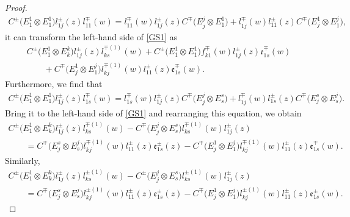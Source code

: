 \documentclass[10pt,a4paper]{amsart}
\numberwithin{equation}{section}
\begin{document}
\begin{proof}
\begin{gather*}
 C^{\pm}\bigl(E^1_1\otimes E^1_1\bigr)l_{1j}^{\pm}(z)l_{11}^{\mp}(w)= l_{11}^{\mp}(w)l_{1j}^{\pm}(z)C^{\mp}\bigl(E^j_j\otimes E^1_1\bigr)+l_{1j}^{\mp}(w)l_{11}^{\pm}(z)C^{\mp}\bigl(E^1_j\otimes E^j_1\bigr),
\end{gather*}
it can transform the left-hand side of \eqref{GS1} as
\begin{gather*}
 C^{\pm}\bigl(E^1_1\otimes E^k_k\bigr)l_{1j}^{\pm}(z)l_{ks}^{\mp(1)}(w)+ C^{\pm}\bigl(E^1_1\otimes E^1_1\bigr)f_{k1}^{\mp}(w)l_{1j}^{\pm}(z)\mathfrak{e}_{1s}^{\mp}(w)\\
 \qquad{}+
 C^{\mp}\bigl(E^1_j\otimes E^j_1\bigr)l_{kj}^{\mp(1)}(w)l_{11}^{\pm}(z)\mathfrak{e}_{1s}^{\mp}(w).
\end{gather*}
Furthermore, we find that
\begin{gather*}
 C^{\pm}\bigl(E^1_1\otimes E^1_1\bigr)l_{1j}^{\pm}(z)l_{1s}^{\mp}(w)= l_{1s}^{\mp}(w)l_{1j}^{\pm}(z)C^{\mp}\bigl(E^j_j\otimes E^s_s\bigr)+l_{1j}^{\mp}(w)l_{1s}^{\pm}(z)C^{\mp}\bigl(E^s_j\otimes E^j_s\bigr).
\end{gather*}
Bring it to the left-hand side of \eqref{GS1} and rearranging this equation, we obtain
\begin{gather}
 C^{\pm}\bigl(E^1_1\otimes E^k_k\bigr)l_{1j}^{\pm}(z)l_{ks}^{\mp(1)}(w)- C^{\mp}\bigl(E^j_j\otimes E^s_s\bigr)l_{ks}^{\mp(1)}(w)l_{1j}^{\pm}(z) \nonumber\\ \qquad=C^{\mp}\bigl(E^s_j\otimes E^j_s\bigr)l_{kj}^{\mp(1)}(w)l_{11}^{\pm}(z)\mathfrak{e}_{1s}^{\pm}(z)-C^{\mp}\bigl(E^1_j\otimes E^j_1\bigr)l_{kj}^{\mp(1)}(w)l_{11}^{\pm}(z)\mathfrak{e}_{1s}^{\mp}(w).\label{GS2}
\end{gather}
Similarly,
\begin{gather*}%
 C^{\pm}\bigl(E^1_1\otimes E^k_k\bigr)l_{1j}^{\pm}(z)l_{ks}^{\pm(1)}(w)- C^{\pm}\bigl(E^j_j\otimes E^s_s\bigr)l_{ks}^{\pm(1)}(w)l_{1j}^{\pm}(z) \\ \qquad =C^{\mp}\bigl(E^s_j\otimes E^j_s\bigr)l_{kj}^{\pm(1)}(w)l_{11}^{\pm}(z)\mathfrak{e}_{1s}^{\pm}(z)-C^{\mp}\bigl(E^1_j\otimes E^j_1\bigr)l_{kj}^{\pm(1)}(w)l_{11}^{\pm}(z)\mathfrak{e}_{1s}^{\pm}(w).
\end{gather*}





\end{proof}
\end{document}
